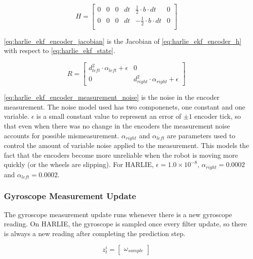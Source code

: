 \begin{equation}
	H =
	\begin{bmatrix}
		0 & 0 & 0 & dt & \frac{1}{2} \cdot b \cdot dt & 0 \\
		0 & 0 & 0 & dt & -\frac{1}{2} \cdot b \cdot dt & 0 \\
	\end{bmatrix}
	\label{eq:harlie_ekf_encoder_jacobian}
\end{equation}

\eqref{eq:harlie_ekf_encoder_jacobian} is the Jacobian of \eqref{eq:harlie_ekf_encoder_h} with respect to \eqref{eq:harlie_ekf_state}.

\begin{equation}
	R =
	\begin{bmatrix}
		d_{left}^2 \cdot \alpha_{left} + \epsilon & 0 \\
		0 & d_{right}^2 \cdot \alpha_{right} + \epsilon
	\end{bmatrix}
	\label{eq:harlie_ekf_encoder_measurement_noise}
\end{equation}

\eqref{eq:harlie_ekf_encoder_measurement_noise} is the noise in the encoder measurement. The noise model used has two componenets, one constant and one variable. $\epsilon$ is a small constant value to represent an error of $\pm 1$ encoder tick, so that even when there was no change in the encoders the measurement noise accounts for possible mismeasurement. $\alpha_{right}$ and $\alpha_{left}$ are parameters used to control the amount of variable noise applied to the measurement. This models the fact that the encoders become more unreliable when the robot is moving more quickly (or the wheels are slipping). For HARLIE, $\epsilon = 1.0\times10^{-8}$, $\alpha_{right} = 0.0002$ and $\alpha_{left} = 0.0002$.

\subsubsection{Gyroscope Measurement Update}\label{subsubsec:harlie_ekf_gyro_measurement}

The gyroscope measurement update runs whenever there is a new gyroscope reading. On HARLIE, the gyroscope is sampled once every filter update, so there is always a new reading after completing the prediction step.

\begin{equation}
	z_t^i = 
	\begin{bmatrix}
		\omega_{sample}
	\end{bmatrix}
	\label{eq:harlie_ekf_gyro_z}
\end{equation}

